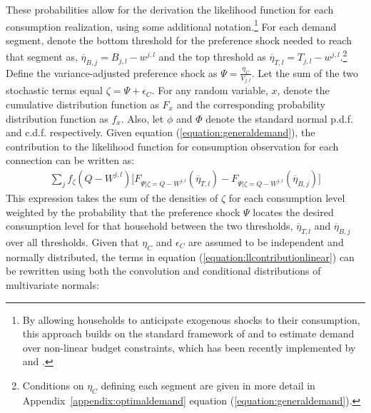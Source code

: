 \documentclass[12pt]{article}
\begin{document}
These probabilities allow for the derivation the likelihood function for each consumption realization, using some additional notation.\footnote{By allowing households to anticipate exogenous shocks to their consumption, this approach builds on the standard framework of \cite{burtless1978effect} and \cite{moffitt1986econometrics} to estimate demand over non-linear budget constraints, which has been recently implemented by \cite{szabo2015value} and \cite{mcrae2014infrastructure}.}  For each demand segment, denote the bottom threshold for the preference shock needed to reach that segment as, $\overline{\eta}_{B,j} = B_{j,l} - w^{j,l} $ and the top threshold as $\overline{\eta}_{T,l} = T_{j,l} - w^{j,l} $.\footnote{Conditions on $\eta_C$ defining each segment are given in more detail in Appendix~\ref{appendix:optimaldemand} equation (\ref{equation:generaldemand}).}  Define the variance-adjusted preference shock as $\Psi = \frac{\eta_C}{V_{j,l}}$.  Let the sum of the two stochastic terms equal $\zeta = \Psi + \epsilon_C$.  For any random variable, $x$, denote the cumulative distribution function as $F_x$ and the corresponding probability distribution function as $f_x$.  Also, let $\phi$ and $\Phi$ denote the standard normal p.d.f. and c.d.f. respectively.  Given equation (\ref{equation:generaldemand}), the contribution to the likelihood function for consumption observation for each connection can be written as:
\begin{align}\label{equation:llcontributionlinear}
\sum_{j} f_{\zeta}( Q - W^{j,l} ) \Big [ F_{ \Psi | \zeta = Q - W^{j,l} } (\overline{\eta}_{T,l}) - F_{ \Psi | \zeta = Q - W^{j,l} } (\overline{\eta}_{B,j})  \Big ]
\end{align}
This expression takes the sum of the densities of $\zeta$ for each consumption level weighted by the probability that the preference shock $\Psi$ locates the desired consumption level for that household between the two thresholds, $\overline{\eta}_{T,l}$ and $\overline{\eta}_{B,j}$ over all thresholds.  Given that $\eta_C$ and $\epsilon_C$ are assumed to be independent and normally distributed, the terms in equation (\ref{equation:llcontributionlinear}) can be rewritten using both the convolution and conditional distributions of multivariate normals:
\end{document}
